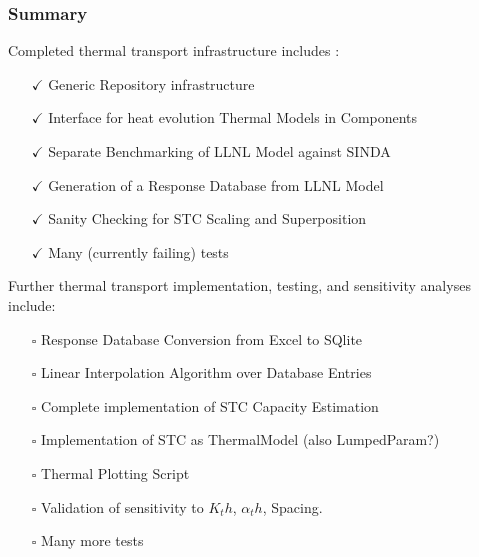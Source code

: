 \begin{frame}[ctb!]
  \frametitle{Summary}
  Completed thermal transport infrastructure includes :
  \begin{itemize}
  \item[$\checkmark$] Generic Repository infrastructure 
  \item[$\checkmark$] Interface for heat evolution Thermal Models in Components
  \item[$\checkmark$] Separate Benchmarking of LLNL Model against SINDA
  \item[$\checkmark$] Generation of a Response Database from LLNL Model
  \item[$\checkmark$] Sanity Checking for STC Scaling and Superposition
  \item[$\checkmark$] Many (currently failing) tests
  \end{itemize}
  Further thermal transport implementation, testing, and sensitivity analyses 
  include:
  \begin{itemize}
  \item[$\square$] Response Database Conversion from Excel to SQlite
  \item[$\square$] Linear Interpolation Algorithm over Database Entries
  \item[$\square$] Complete implementation of STC Capacity Estimation 
  \item[$\square$] Implementation of STC as ThermalModel (also LumpedParam?)
  \item[$\square$] Thermal Plotting Script
  \item[$\square$] Validation of sensitivity to $K_th$, $\alpha_th$, Spacing.
  \item[$\square$] Many more tests
  \end{itemize}

\end{frame}

